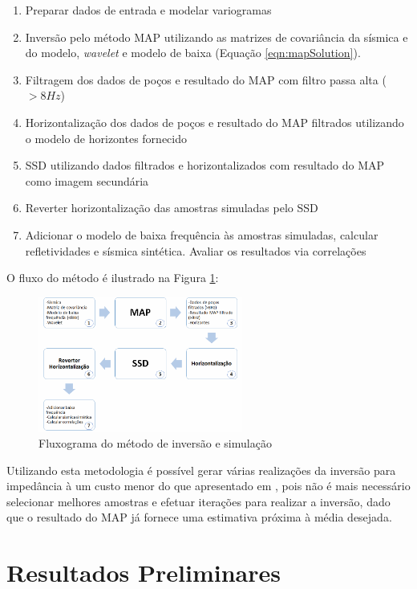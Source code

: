\begin{enumerate}
  \item Preparar dados de entrada e modelar variogramas
  \item Inversão pelo método MAP utilizando as matrizes de covariância da
  sísmica e do modelo, \textit{wavelet} e modelo de baixa (Equação
  \ref{eqn:mapSolution}).
  \item Filtragem dos dados de poços e resultado do MAP com filtro passa alta
  ($>8Hz$)
  \item Horizontalização dos dados de poços e resultado do MAP filtrados
  utilizando o modelo de horizontes fornecido
  \item SSD utilizando dados filtrados e horizontalizados com resultado do MAP
  como imagem secundária
  \item Reverter horizontalização das amostras simuladas pelo SSD
  \item Adicionar o modelo de baixa frequência às amostras simuladas, calcular
  refletividades e sísmica sintética. Avaliar os resultados via correlações
\end{enumerate}

O fluxo do método é ilustrado na Figura \ref{fig:fluxo}:

\begin{figure}[htp]
\begin{center}
  \includegraphics[width=0.6\textwidth]{fig/fluxo}
  \caption{Fluxograma do método de inversão e simulação}
  \label{fig:fluxo}
\end{center}
\end{figure}

Utilizando esta metodologia é possível gerar várias realizações da inversão para
impedância à um custo menor do que apresentado em \citep{amilcarInversao}, pois
não é mais necessário selecionar melhores amostras e efetuar iterações para
realizar a inversão, dado que o resultado do MAP já fornece uma estimativa
próxima à média desejada.


\section{Resultados Preliminares}



